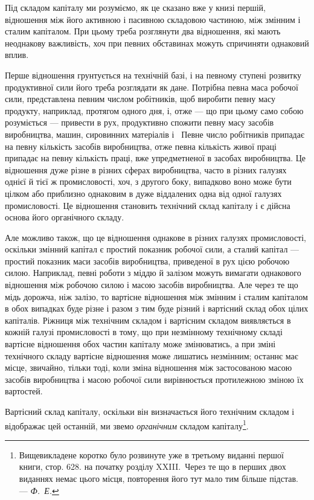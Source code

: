 Під складом капіталу ми розуміємо, як це сказано вже у
книзі першій, відношення між його активною і пасивною складовою
частиною, між змінним і сталим капіталом. При цьому
треба розглянути два відношення, які мають неоднакову важливість,
хоч при певних обставинах можуть спричиняти однаковий
вплив.

Перше відношення грунтується на технічній базі, і на певному
ступені розвитку продуктивної сили його треба розглядати
як дане. Потрібна певна маса робочої сили, представлена
певним числом робітників, щоб виробити певну масу продукту,
наприклад, протягом одного дня, і, отже — що при цьому само
собою розуміється — привести в рух, продуктивно спожити
певну масу засобів виробництва, машин, сировинних матеріалів
і~ Певне число робітників припадає на певну кількість засобів
виробництва, отже певна кількість живої праці припадає
на певну кількість праці, вже упредметненої в засобах виробництва.
Це відношення дуже різне в різних сферах виробництва,
часто в різних галузях однієї й тієї ж промисловості, хоч, з другого
боку, випадково воно може бути цілком або приблизно
однаковим в дуже віддалених одна від одної галузях промисловості.
Це відношення становить технічний склад капіталу і є дійсна
основа його органічного складу.

Але можливо також, що це відношення однакове в різних
галузях промисловості, оскільки змінний капітал є простий показник
робочої сили, а сталий капітал — простий показник маси
засобів виробництва, приведеної в рух цією робочою силою.
Наприклад, певні роботи з міддю й залізом можуть вимагати
однакового відношення між робочою силою і масою засобів
виробництва. Але через те що мідь дорожча, ніж залізо, то вартісне
відношення між змінним і сталим капіталом в обох випадках
буде різне і разом з тим буде різний і вартісний склад
обох цілих капіталів. Ріжниця між технічним складом і вартісним
складом виявляється в кожній галузі промисловості
в тому, що при незмінному технічному складі вартісне відношення
обох частин капіталу може змінюватись, а при зміні
технічного складу вартісне відношення може лишатись незмінним;
останнє має місце, звичайно, тільки тоді, коли зміна
відношення між застосованою масою засобів виробництва і масою
робочої сили вирівнюється протилежною зміною їх вартостей.

Вартісний склад капіталу, оскільки він визначається його
технічним складом і відображає цей останній, ми звемо \emph{органічним}
складом капіталу\footnote{
Вищевикладене коротко було розвинуте уже в третьому виданні першої
книги, стор. 628. на початку розділу XXIII.~Через
те що в перших двох виданнях немає цього місця, повторення його тут мало
тим більше підстав. — \emph{Ф.~Е.}
}.

